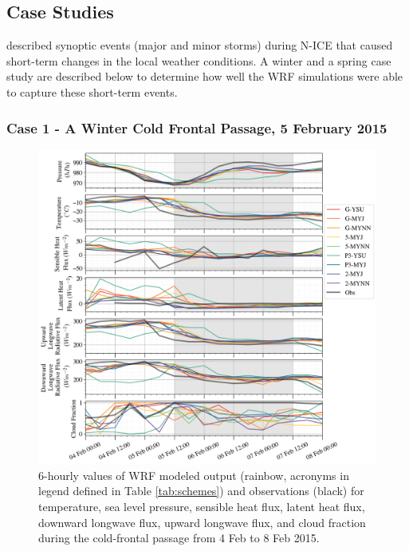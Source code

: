 \subsection{Case Studies}
\citet{cohen:2015} described synoptic events (major and minor storms) during N-ICE that caused short-term changes in the local weather conditions. A winter and a spring case study are described below to determine how well the WRF simulations were able to capture these short-term events.

\subsubsection{Case 1 - A Winter Cold Frontal Passage, 5 February 2015}
\begin{figure}[p]
    \centering \hspace*{-0.75cm}
    \includegraphics[width=1.1\linewidth]{figures/chapter3/wrf_case1.png}
    \caption[Polar WRF Case 1 - Winter cold front (5 Feb 2015) time series]{6-hourly values of WRF modeled output (rainbow, acronyms in legend defined in Table \ref{tab:schemes}) and observations (black) for temperature, sea level pressure, sensible heat flux, latent heat flux, downward longwave flux, upward longwave flux, and cloud fraction during the cold-frontal passage from 4 Feb to 8 Feb 2015.}
    \label{fig:wrf_case1}
\end{figure}

